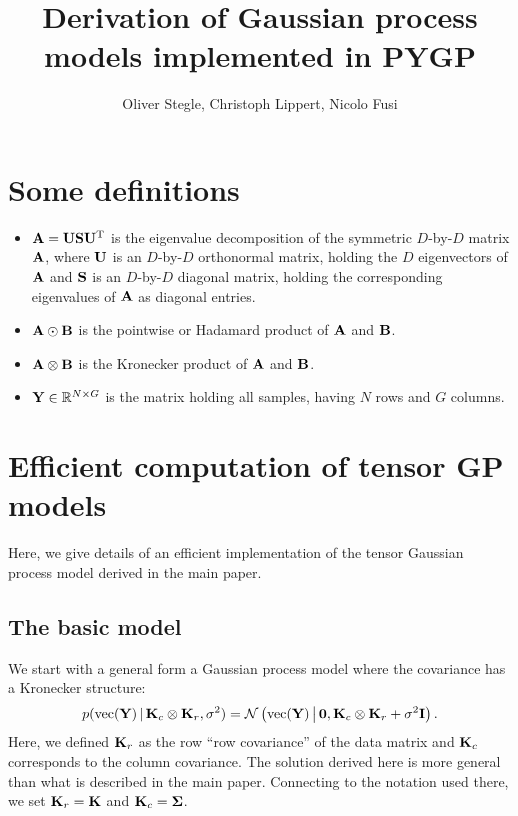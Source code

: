 \documentclass{article}
\title{Derivation of Gaussian process models implemented in PYGP}
\author[1]{Oliver Stegle, Christoph Lippert, Nicolo Fusi}
\affil[1]{Department Empirical Inference,
Max Planck Institutes T\"ubingen, Germany}
\date{}
\newcommand{\B}[1]{{\bf{#1}}}
\begin{document}
\maketitle




\section{Some definitions}
\begin{itemize}
\item $\B{A}=\B{U}\B{S}\B{U}^{\T}$ is the eigenvalue decomposition of
  the symmetric $D$-by-$D$ matrix $\B{A}$, where $\B{U}$ is an
  $D$-by-$D$ orthonormal matrix, holding the $D$ eigenvectors of
  $\B{A}$ and $\B{S}$ is an $D$-by-$D$ diagonal matrix, holding the
  corresponding eigenvalues of $\B{A}$ as diagonal entries. 
\item $\B{A}\odot\B{B}$ is the pointwise or Hadamard product of $\B{A}$ and $\B{B}$.
\item $\B{A}\otimes\B{B}$ is the Kronecker product of $\B{A}$ and $\B{B}$.
\item $\B{Y}\in\mathbb{R}^{N\times G}$ is the matrix holding all samples, having $N$ rows and $G$ columns.
\end{itemize}

\section{Efficient computation of tensor GP models}
\newcommand{\BS}{\left( \B{C} + \sigma^{2}\B{I}\right )}
Here, we give details of an efficient implementation of the tensor
Gaussian process model derived in the main paper.
\subsection*{The basic model}
We start with a general form a Gaussian process model where the
covariance has a Kronecker structure:
\begin{align}
\label{eq:1}
p(\col(\B{Y}) \given \B{K}_c \otimes \B{K}_r,\sigma^2)  =  \normal{\col(\B{Y})}{\boldzero,
  \B{K}_c \otimes \B{K}_r + \sigma^2 \B{I}}.
\end{align}
Here, we defined $\B{K}_r$ as the row ``row covariance''  of the data
matrix and $\B{K}_c$ corresponds to the column covariance. 
The solution derived here is more general than what is described in
the main paper. 
Connecting to the notation used there, we set 
$\B{K}_r = \B{K}$ and $\B{K}_c = \bSigma$. 
\end{document}
